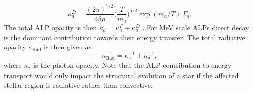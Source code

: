 \begin{equation}
    \label{eq: ALP opacity}
    \kappa_{a}^D=\frac{(2\pi)^{7/2}}{45\rho} \bigg(\frac{T}{m_a}\bigg)^{5/2}\exp(m_a/T)\ \Gamma_{a}.
\end{equation}
The total ALP opacity is then \(\kappa_a=\kappa_a^P+\kappa_a^D\) \cite{Dolan:2017osp}. For MeV scale ALPs direct decay is the dominant contribution towards their energy transfer. The total radiative opacity $\kappa_{\mathrm{Rad}}$ is then given as
\begin{equation}
    \kappa_{\mathrm{Rad}}^{-1}=\kappa_{\gamma}^{-1}+\kappa_{a}^{-1},
\end{equation}
where $\kappa_{\gamma}$ is the photon opacity. Note that the ALP contribution to energy transport would only impact the structural evolution of a star if the affected stellar region is radiative rather than convective.